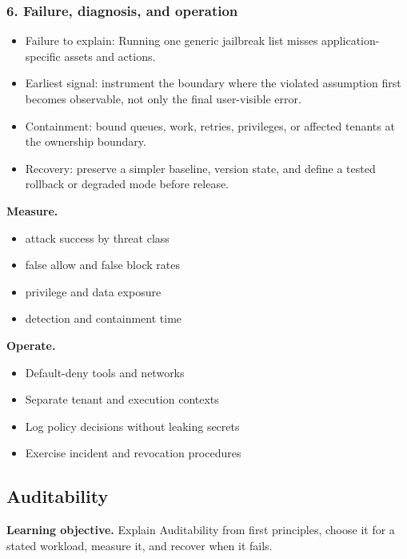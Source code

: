 \subsubsection*{6. Failure, diagnosis, and operation}
\begin{itemize}
\item Failure to explain: Running one generic jailbreak list misses application-specific assets and actions.
\item Earliest signal: instrument the boundary where the violated assumption first becomes observable, not only the final user-visible error.
\item Containment: bound queues, work, retries, privileges, or affected tenants at the ownership boundary.
\item Recovery: preserve a simpler baseline, version state, and define a tested rollback or degraded mode before release.
\end{itemize}
\textbf{Measure.}\begin{itemize}
\item attack success by threat class
\item false allow and false block rates
\item privilege and data exposure
\item detection and containment time
\end{itemize}
\textbf{Operate.}\begin{itemize}
\item Default-deny tools and networks
\item Separate tenant and execution contexts
\item Log policy decisions without leaking secrets
\item Exercise incident and revocation procedures
\end{itemize}
\subsection{Auditability}
\textbf{Learning objective.} Explain Auditability from first principles, choose it for a stated workload, measure it, and recover when it fails.
